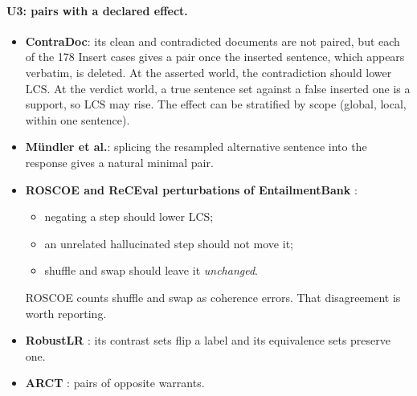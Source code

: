 \documentclass[10pt]{article}
\newcommand{\LCS}{\mathrm{LCS}}
\begin{document}
\paragraph{U3: pairs with a declared effect.}
\begin{itemize}
\item \textbf{ContraDoc}: its clean and contradicted documents are not paired, but each of the
  178 Insert cases gives a pair once the inserted sentence, which appears verbatim, is deleted.
  At the asserted world, the contradiction should lower $\LCS$. At the verdict world, a true
  sentence set against a false inserted one is a support, so $\LCS$ may rise. The effect can be
  stratified by scope (global, local, within one sentence).
\item \textbf{Mündler et al.}: splicing the resampled alternative sentence into the response gives a
  natural minimal pair.
\item \textbf{ROSCOE and ReCEval perturbations of EntailmentBank} \citep{roscoe,receval}:
  \begin{itemize}
  \item negating a step should lower $\LCS$;
  \item an unrelated hallucinated step should not move it;
  \item shuffle and swap should leave it \emph{unchanged}.
  \end{itemize}
  ROSCOE counts shuffle and swap as coherence errors. That disagreement is worth reporting.
\item \textbf{RobustLR} \citep{robustlr}: its contrast sets flip a label and its equivalence sets
  preserve one.
\item \textbf{ARCT} \citep{arct}: pairs of opposite warrants.
\end{itemize}
\end{document}
